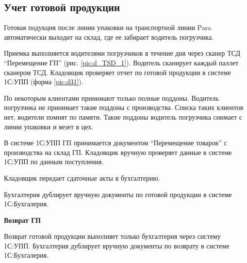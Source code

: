 \newpage
\subsection{Учет готовой продукции}
\label{bp:readygoods}

Готовая подукция после линии упаковки на транспортной линии Para автоматически выходит на склад, где ее забирает водитель погрузчика.

Приемка выполняется водителями погрузчиков в течение дня через сканер ТСД “Перемещение ГП” (рис. \ref{pic:d_TSD_1}).
Водитель сканирует каждый паллет сканером ТСД. 
Кладовщик проверяет отчет по готовой продукции в системе 1С:УПП (форма \ref{pic:d31}).

По некоторым клиентами принимают только полные поддоны. Водитель погрузчика не принимает такие поддоны с производства. Списка таких клиентов нет, водители помнят по памяти. Такие поддоны водитель погрузчика снимает с линии упаковки и везет в цех.

В системе 1С:УПП ГП принимается документом “Перемещение товаров” с производства на склад ГП.
Кладовщик вручную проверяет данные в системе 1С:УПП по данным поступления.



Кладовщик передает сдаточные акты в бухгалтерию.

Бухгалтерия дублирует вручную документы по готовой продукции в системе 1С:Бухгалерия.

\textbf{Возврат ГП}

Возврат готовой продукции выполняет только бухгалтерия через систему 1С:УПП. Бухгалтерия дублирует вручную документы по возврату в системе 1С:Бухгалерия.




